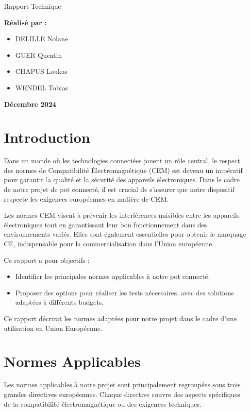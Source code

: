 \documentclass[a4paper,12pt]{article}
\begin{document}
\begin{titlepage}
\begin{center}
        \vspace{1cm}
        \Large
        Rapport Technique

        \vspace{4cm}
        \textbf{Réalisé par :}
        \vspace{0.5cm}
        \begin{itemize}
            \item DELILLE Nolane
            \item GUER Quentin
            \item CHAPUS Loukas
            \item WENDEL Tobias
        \end{itemize}

        \vfill
        \Large
        \textbf{Décembre 2024}
    \end{center}
\end{titlepage}
\newpage
\tableofcontents
\newpage

\newpage

\section*{Introduction}
Dans un monde où les technologies connectées jouent un rôle central, le respect des normes de Compatibilité Électromagnétique (CEM) est devenu un impératif pour garantir la qualité et la sécurité des appareils électroniques. Dans le cadre de notre projet de pot connecté, il est crucial de s'assurer que notre dispositif respecte les exigences européennes en matière de CEM.

Les normes CEM visent à prévenir les interférences nuisibles entre les appareils électroniques tout en garantissant leur bon fonctionnement dans des environnements variés. Elles sont également essentielles pour obtenir le marquage CE, indispensable pour la commercialisation dans l'Union européenne.

Ce rapport a pour objectifs :
\begin{itemize}
    \item Identifier les principales normes applicables à notre pot connecté.
    \item Proposer des options pour réaliser les tests nécessaires, avec des solutions adaptées à différents budgets.
\end{itemize}
Ce rapport décrirat les normes adaptées pour notre projet dans le cadre d'une utilisation en Union Européenne.
\section{Normes Applicables}
Les normes applicables à notre projet sont principalement regroupées sous trois grandes directives européennes. Chaque directive couvre des aspects spécifiques de la compatibilité électromagnétique ou des exigences techniques.
\end{document}
